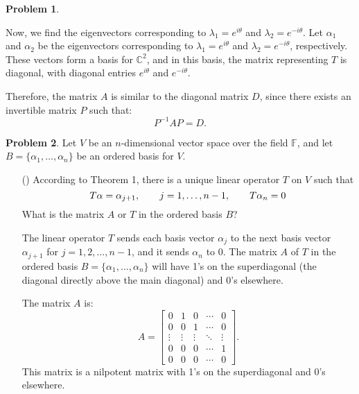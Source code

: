 \documentclass[12pt]{article}
\theoremstyle{definition}
\newtheorem{problem}{Problem}
\newcounter{subq}[problem]
\newenvironment{subproblem}
{\refstepcounter{subq} \begin{itemize} \item[(\alph{subq})]}
{\end{itemize} \medskip}
\begin{document}
\begin{problem}
\begin{solution}
        Now, we find the eigenvectors corresponding to \(\lambda_1 = e^{i\theta}\) and \(\lambda_2 = e^{-i\theta}\).
        Let \(\alpha_1\) and \(\alpha_2\) be the eigenvectors corresponding to \(\lambda_1 = e^{i\theta}\) and \(\lambda_2 = e^{-i\theta}\), respectively. These vectors form a basis for \(\mathbb{C}^2\), and in this basis, the matrix representing \(T\) is diagonal, with diagonal entries \(e^{i\theta}\) and \(e^{-i\theta}\).

        Therefore, the matrix \(A\) is similar to the diagonal matrix \(D\), since there exists an invertible matrix \(P\) such that:
        \[
        P^{-1}AP = D.
        \]

    \end{solution}
\end{problem}

\begin{problem}
    Let $V$ be an $n$-dimensional vector space over the field $\mathbb{F}$, and let $B = \{\alpha_1,\ldots,\alpha_n\}$ be an ordered basis for $V$.

    \begin{subproblem}
        According to Theorem 1, there is a unique linear operator $T$ on $V$ such that
        \[T\alpha = \alpha_{j+1}, \hspace{20px} j = 1,\ldots,n - 1, \hspace{20px} T\alpha_n = 0\]
        What is the matrix $A$ or $T$ in the ordered basis $B$?
        \begin{solution}

            The linear operator \(T\) sends each basis vector \(\alpha_j\) to the next basis vector \(\alpha_{j+1}\) for \(j = 1, 2, \ldots, n-1\), and it sends \(\alpha_n\) to 0. The matrix \(A\) of \(T\) in the ordered basis \(B = \{\alpha_1, \ldots, \alpha_n\}\) will have 1's on the superdiagonal (the diagonal directly above the main diagonal) and 0's elsewhere.

            The matrix \(A\) is:
            \[
            A = \begin{bmatrix}
            0 & 1 & 0 & \cdots & 0 \\
            0 & 0 & 1 & \cdots & 0 \\
            \vdots & \vdots & \vdots & \ddots & \vdots \\
            0 & 0 & 0 & \cdots & 1 \\
            0 & 0 & 0 & \cdots & 0
            \end{bmatrix}.
            \]
            This matrix is a nilpotent matrix with 1's on the superdiagonal and 0's elsewhere.
            

\end{solution}
\end{subproblem}
\end{problem}
\end{document}

